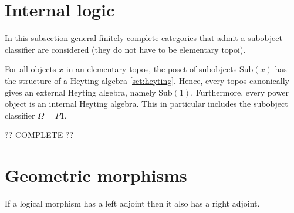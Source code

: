 \section{Internal logic}\label{section:internal_logic}

    In this subsection general finitely complete categories that admit a subobject classifier are considered (they do not have to be elementary topoi).


    \begin{property}
        For all objects $x$ in an elementary topos, the poset of subobjects $\mathrm{Sub}(x)$ has the structure of a Heyting algebra \ref{set:heyting}. Hence, every topos canonically gives an external Heyting algebra, namely $\mathrm{Sub}(1)$. Furthermore, every power object is an internal Heyting algebra. This in particular includes the subobject classifier $\Omega=P1$.
    \end{property}

    ?? COMPLETE ??

\section{Geometric morphisms}


    \begin{property}
        If a logical morphism has a left adjoint then it also has a right adjoint.
    \end{property}


